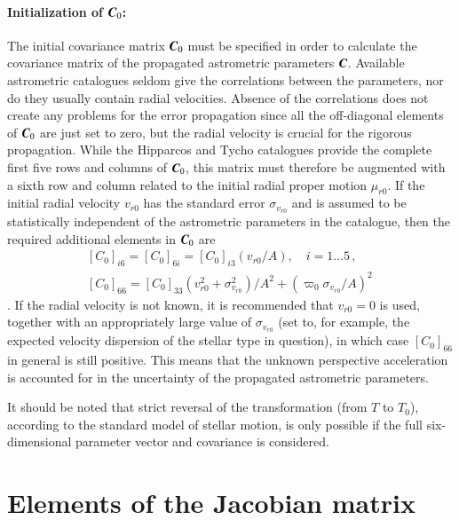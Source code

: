 \documentclass{aa}
\def\vec#1{\ensuremath{\mathchoice{\mbox{\boldmath$\displaystyle#1$}}
{\mbox{\boldmath$\textstyle#1$}}
{\mbox{\boldmath$\scriptstyle#1$}}
{\mbox{\boldmath$\scriptscriptstyle#1$}}}}
\begin{document}
\paragraph{Initialization of $\vec{C}_0$:}

The initial covariance matrix $\vec{C}_0$ must be specified in order to calculate the covariance matrix
of the propagated astrometric parameters $\vec{C}$. Available astrometric catalogues seldom give the
correlations between the parameters, nor do they usually contain radial velocities. Absence of the
correlations does not create any problems for the error propagation since all the off-diagonal elements of
$\vec{C}_0$ are just set to zero, but the radial velocity is crucial for the rigorous propagation.
While the Hipparcos and Tycho catalogues provide the complete first five rows and columns of
$\vec{C}_0$, this matrix must therefore be augmented with a sixth row and column related to the initial
radial proper motion $\mu_{r0}$. If the initial radial velocity $v_{r0}$ has the standard error
$\sigma_{v_{r0}}$ and is assumed to be statistically independent of the astrometric parameters
in the catalogue, then the required additional elements in $\vec{C}_0$ are
\begin{equation}
 \begin{aligned}
  \left[C_0\right]_{i6}=\left[C_0\right]_{6i}=\left[C_0\right]_{i3}\left(v_{r0}/A\right),
  \quad i=1\dots5\,,\\
  \left[C_0\right]_{66}=\left[C_0\right]_{33}\left(v_{r0}^2+\sigma_{v_{r0}}^2\right)/A^2
  +\left(\varpi_0\sigma_{v_{r0}}/A\right)^2\,
 \end{aligned}
\end{equation}
\citep{esa1997,michalik+2014}.
If the radial velocity is not known, it is recommended that $v_{r0}=0$ is used, together with an
appropriately large value of $\sigma_{v_{r0}}$ (set to, for example, the expected velocity dispersion of the
stellar type in question), in which case $\left[C_0\right]_{66}$ in general is still
positive. This means
that the unknown perspective acceleration is accounted for in the uncertainty of the
propagated astrometric parameters.

It should be noted that strict reversal of the transformation (from $T$ to $T_0$), according
to the standard model of stellar motion, is only possible if the full six-dimensional
parameter vector and covariance is considered.

\section{Elements of the Jacobian matrix}\label{app:jacobian_include}
\end{document}
